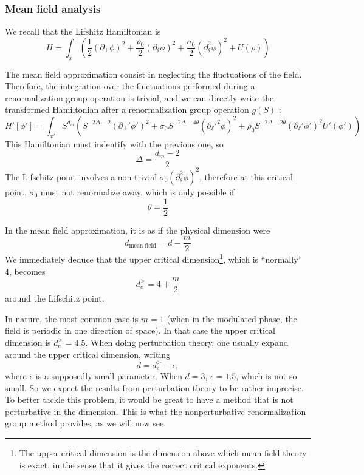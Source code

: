 \subsubsection{Mean field analysis}

We recall that the Lifshitz Hamiltonian is
\begin{equation}
H = \int_x \left( \frac{1}{2}(\partial_\perp \phi)^2 + \frac{\rho_0}{2} (\partial_\sslash \phi)^2 + \frac{\sigma_0}{2} (\partial_\sslash^2 \phi)^2 + U(\rho) \right)
\end{equation}

The mean field approximation consist in neglecting the fluctuations of the field. Therefore, the integration over the fluctuations performed during a renormalization group operation is trivial, and we can directly write the transformed Hamiltonian after a renormalization group operation $g(S)$ :
\begin{equation}
H'[\phi'] = \int_{x'} S^{d_m} \left( S^{-2\Delta -2} (\partial_\perp' \phi')^2 + \sigma_0 S^{-2\Delta - 4 \theta} (\partial_\sslash'^2 \phi)^2 + \rho_0 S^{-2\Delta -2 \theta} (\partial_\sslash' \phi')^2 U'(\phi') \right)
\end{equation}
This Hamiltonian must indentify with the previous one, so
\begin{equation}
\Delta = \frac{d_m -2}{2}
\end{equation}
The Lifschitz point involves a non-trivial $\sigma_0 (\partial_\sslash^2 \phi)^2$, therefore at this critical point, $\sigma_0$ must not renormalize away, which is only possible if
\begin{equation}
\theta = \frac{1}{2}
\end{equation}

In the mean field approximation, it is as if the physical dimension were
\begin{equation}
d_{\text{mean field}} = d - \frac{m}{2}
\end{equation}
We immediately deduce that the upper critical dimension\footnote{The upper critical dimension is the dimension above which mean field theory is exact, in the sense that it gives the correct critical exponents.}, which is ``normally'' 4, becomes
\begin{equation}
d_c^> = 4 + \frac{m}{2}
\end{equation}
around the Lifschitz point.

In nature, the most common case is $m=1$ (when in the modulated phase, the field is periodic in one direction of space). In that case the upper critical dimension is $d_c^> = 4.5$. When doing perturbation theory, one usually expand around the upper critical dimension, writing
\begin{equation}
d = d_c^> - \epsilon,
\end{equation} 
where $\epsilon$ is a supposedly small parameter. When $d=3$, $\epsilon = 1.5$, which is not so small. So we expect the results from perturbation theory to be rather imprecise. To better tackle this problem, it would be great to have a method that is not perturbative in the dimension. This is what the nonperturbative renormalization group method provides, as we will now see.

